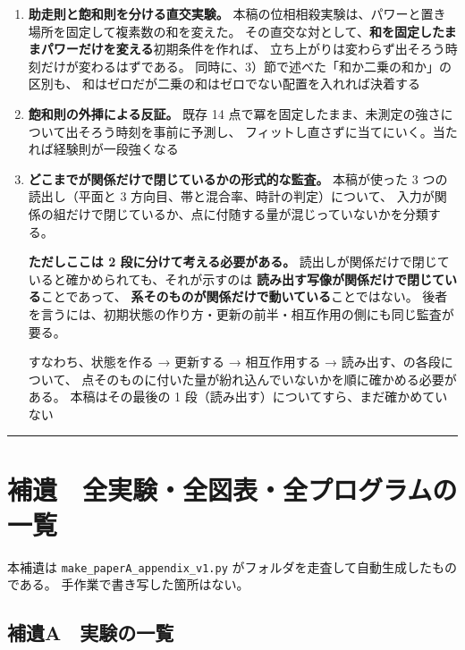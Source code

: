 \documentclass[
]{ltjsarticle}
\begin{document}
\begin{enumerate}
\def\labelenumi{\arabic{enumi}.}
\setcounter{enumi}{7}
\item
  \textbf{助走則と飽和則を分ける直交実験。}
  本稿の位相相殺実験は、パワーと置き場所を固定して複素数の和を変えた。
  その直交な対として、\textbf{和を固定したままパワーだけを変える}初期条件を作れば、
  立ち上がりは変わらず出そろう時刻だけが変わるはずである。
  同時に、3）節で述べた「和か二乗の和か」の区別も、
  和はゼロだが二乗の和はゼロでない配置を入れれば決着する
\item
  \textbf{飽和則の外挿による反証。} 既存 14
  点で冪を固定したまま、未測定の強さについて出そろう時刻を事前に予測し、
  フィットし直さずに当てにいく。当たれば経験則が一段強くなる
\item
  \textbf{どこまでが関係だけで閉じているかの形式的な監査。} 本稿が使った
  3 つの読出し（平面と 3 方向目、帯と混合率、時計の判定）について、
  入力が関係の組だけで閉じているか、点に付随する量が混じっていないかを分類する。

  \textbf{ただしここは 2 段に分けて考える必要がある。}
  読出しが関係だけで閉じていると確かめられても、それが示すのは
  \textbf{読み出す写像が関係だけで閉じている}ことであって、
  \textbf{系そのものが関係だけで動いている}ことではない。
  後者を言うには、初期状態の作り方・更新の前半・相互作用の側にも同じ監査が要る。

  すなわち、状態を作る → 更新する → 相互作用する →
  読み出す、の各段について、
  点そのものに付いた量が紛れ込んでいないかを順に確かめる必要がある。
  本稿はその最後の 1 段（読み出す）についてすら、まだ確かめていない
\end{enumerate}

\begin{center}\rule{0.5\linewidth}{0.5pt}\end{center}

\section{補遺　全実験・全図表・全プログラムの一覧}\label{ux88dcux907a-ux5168ux5b9fux9a13ux5168ux56f3ux8868ux5168ux30d7ux30edux30b0ux30e9ux30e0ux306eux4e00ux89a7}

本補遺は \texttt{make\_paperA\_appendix\_v1.py}
がフォルダを走査して自動生成したものである。
手作業で書き写した箇所はない。

\subsection{補遺A　実験の一覧}\label{ux88dcux907aa-ux5b9fux9a13ux306eux4e00ux89a7}
\end{document}
